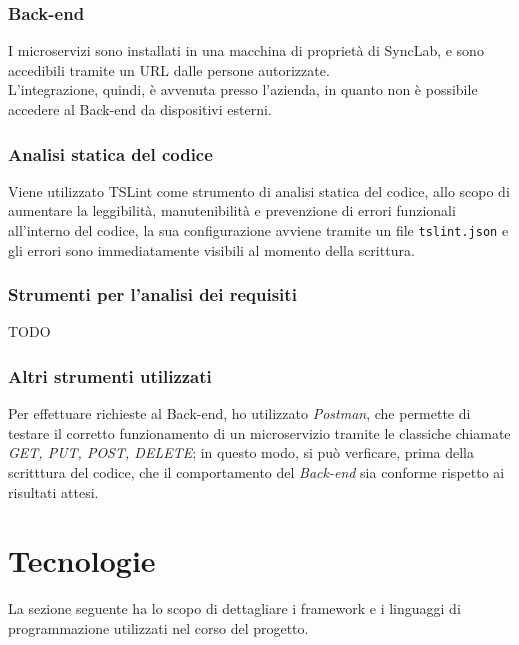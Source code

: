 \subsubsection{Back-end}
I microservizi sono installati in una macchina di proprietà di SyncLab, e sono accedibili tramite un URL dalle persone autorizzate.\\
L'integrazione, quindi, è avvenuta presso l'azienda, in quanto non è possibile accedere al Back-end da dispositivi esterni.

\subsubsection{Analisi statica del codice} \label{tslint}
Viene utilizzato TSLint come strumento di analisi statica del codice, allo scopo di aumentare la leggibilità, manutenibilità e prevenzione di errori funzionali all'interno del codice, la sua configurazione avviene tramite un file \texttt{tslint.json} e gli errori sono immediatamente visibili al momento della scrittura.

\subsubsection{Strumenti per l'analisi dei requisiti}
TODO

\subsubsection{Altri strumenti utilizzati}
Per effettuare richieste al \gls{Back-end}, ho utilizzato \textit{Postman}, che permette di testare il corretto funzionamento di un microservizio tramite le classiche chiamate \textit{GET, PUT, POST, DELETE}; in questo modo, si può verficare, prima della scritttura del codice, che il comportamento del \textit{Back-end} sia conforme rispetto ai risultati attesi.

\section{Tecnologie}
La sezione seguente ha lo scopo di dettagliare  i framework e i linguaggi di programmazione utilizzati nel corso del progetto.

